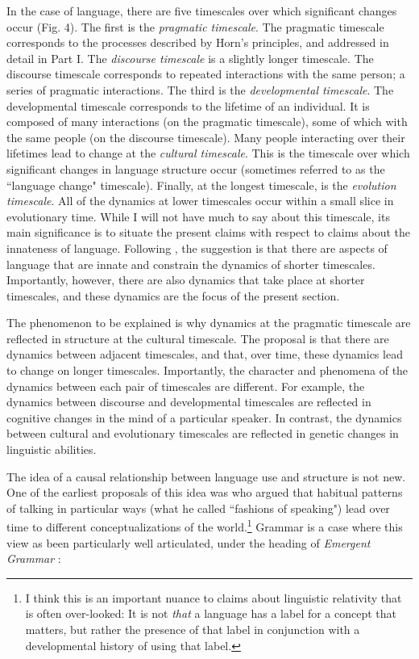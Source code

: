\documentclass[man, noapacite, 12pt]{apa2}
\begin{document}
In the case of language,  there are five timescales over which significant changes occur (Fig. 4). The first is the {\it pragmatic timescale}. The pragmatic timescale corresponds to the processes described by Horn's principles, and addressed in detail in Part I. The {\it discourse timescale} is a slightly longer timescale. The discourse timescale corresponds to repeated interactions with the same person; a series of pragmatic interactions. The third is the {\it developmental timescale}. The developmental timescale corresponds to the lifetime of an individual. It is composed of many interactions (on the pragmatic timescale), some of which with the same people (on the discourse timescale).  Many people interacting over their lifetimes lead to change at the {\it cultural timescale}. This is the timescale over which significant changes in language structure  occur (sometimes referred to as the ``language change" timescale). Finally, at the longest timescale, is the {\it evolution timescale}. All of the dynamics at lower timescales occur within a small slice in evolutionary time. While I will not have much to say about this timescale, its main significance is to situate the present claims with respect to claims about the innateness of language. Following , the suggestion is that there are aspects of language that are innate and constrain the dynamics of shorter timescales. Importantly, however, there are also  dynamics that take place at  shorter timescales, and these dynamics are the focus of the present section.

The phenomenon to be explained is why dynamics at the pragmatic timescale are reflected in structure at the cultural timescale. The proposal is that there are dynamics between adjacent timescales, and that, over time, these dynamics lead to change on longer timescales. Importantly, the character and phenomena of the dynamics between each pair of timescales are different. For example,  the dynamics between discourse and developmental timescales are reflected in cognitive changes in the mind of a particular speaker. In contrast, the dynamics between cultural and evolutionary timescales are reflected in genetic changes in linguistic abilities.

The idea of a causal relationship between language use and structure is not new. One of the earliest proposals of this idea was  who argued that habitual patterns of talking in particular ways (what he called ``fashions of speaking") lead over time to different conceptualizations of the world.\footnote{I think this is an important nuance to claims about linguistic relativity that is often over-looked: It is not {\it that} a language has a label for a concept that matters,  but rather the presence of that label in conjunction with a developmental history of using that label.} Grammar is a case where this view as been particularly well articulated, under the heading of {\it Emergent Grammar} \cite{hopper1987emergent}: 
\end{document}
